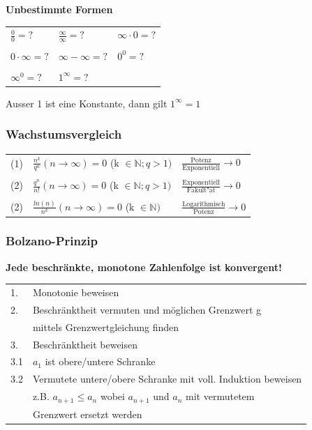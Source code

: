 			\textbf{Unbestimmte Formen} \\
				\begin{tabular}{lll}
					$\frac{0}{0} = ?$    & $\frac{\infty}{\infty} = ?$ & $\infty \cdot 0 = ?$ \\
					\\
					$0 \cdot \infty = ?$ & $\infty - \infty = ?$       & $0^0 = ?$ \\
					\\
					$\infty^0 = ?$       & $1^{\infty} = ?$            & \\
				\end{tabular}
			
				Ausser 1 ist eine Konstante, dann gilt $1^{\infty} = 1 $ \\
				
		\subsubsection{Wachstumsvergleich} 
			\begin{tabular}{lll}
				(1) & $\frac{n^k}{q^n} (n \rightarrow \infty)= 0$  (k $\in \mathbb{N}; q > 1)$ & $\frac{\text{Potenz}}{\text{Exponentiell}} \rightarrow 0$\\
				\\
				(2) & $\frac{q^n}{n!} (n \rightarrow \infty)= 0$  (k $\in \mathbb{N}; q > 1)$  & $\frac{\text{Exponentiell}}{\text{Fakult"at}} \rightarrow 0$ \\
				\\
				(2) & $\frac{ln(n)}{n^k} (n \rightarrow \infty)= 0$  (k $\in \mathbb{N})$      & $\frac{\text{Logarithmisch}}{\text{Potenz}} \rightarrow 0$ \\
			\end{tabular}						
				
		\subsubsection{Bolzano-Prinzip}
			\textbf{Jede beschränkte, monotone Zahlenfolge ist konvergent!} \\
				\begin{tabular}{ll}
					1. & Monotonie beweisen \\
					2. &  Beschränktheit vermuten und möglichen Grenzwert g \\ 
					   & mittels Grenzwertgleichung finden  \\
					3. & Beschränktheit beweisen \\
					3.1 & $a_1$ ist obere/untere Schranke \\
					3.2 & Vermutete untere/obere Schranke mit voll. Induktion beweisen \\
					    & z.B. $a_{n+1} \leq a_n$ wobei $a_{n+1}$ und $a_n$ mit vermutetem \\
					    & Grenzwert ersetzt werden \\
				\end{tabular}
		
